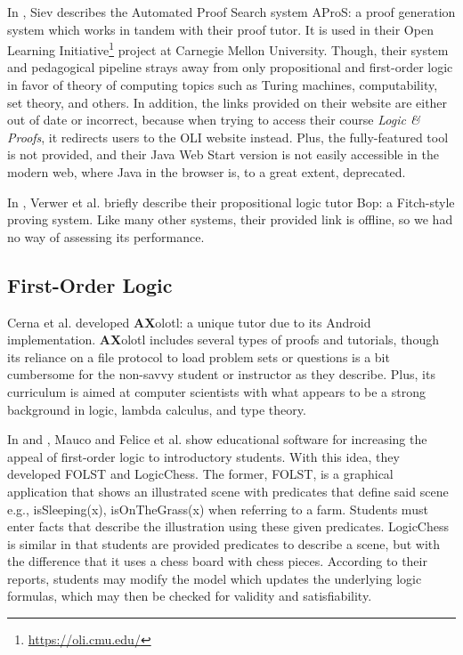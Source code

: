 \documentclass[ms]{uncgdissertationexp2}
\theoremstyle{plain}
\theoremstyle{definition}
\theoremstyle{remark}
\begin{document}
In \cite{apros}, Siev describes the Automated Proof Search system AProS: a proof generation system which works in tandem with their proof tutor. It is used in their Open Learning Initiative\footnote{\url{https://oli.cmu.edu/}} project at Carnegie Mellon University. Though, their system and pedagogical pipeline strays away from only propositional and first-order logic in favor of theory of computing topics such as Turing machines, computability, set theory, and others. In addition, the links provided on their website are either out of date or incorrect, because when trying to access their course \textit{Logic \& Proofs}, it redirects users to the OLI website instead. Plus, the fully-featured tool is not provided, and their Java Web Start version is not easily accessible in the modern web, where Java in the browser is, to a great extent, deprecated.

In \cite{verwer}, Verwer et al. briefly describe their propositional logic tutor Bop: a Fitch-style proving system. Like many other systems, their provided link is offline, so we had no way of assessing its performance.

\subsection{First-Order Logic}
Cerna et al. \cite{cerna} developed \textbf{AX}olotl: a unique tutor due to its Android implementation. \textbf{AX}olotl includes several types of proofs and tutorials, though its reliance on a file protocol to load problem sets or questions is a bit cumbersome for the non-savvy student or instructor as they describe. Plus, its curriculum is aimed at computer scientists with what appears to be a strong background in logic, lambda calculus, and type theory.

In \cite{mauco} and \cite{felice}, Mauco and Felice et al. show educational software for increasing the appeal of first-order logic to introductory students. With this idea, they developed FOLST and LogicChess. The former, FOLST, is a graphical application that shows an illustrated scene with predicates that define said scene e.g., isSleeping(x), isOnTheGrass(x) when referring to a farm. Students must enter facts that describe the illustration using these given predicates. LogicChess is similar in that students are provided predicates to describe a scene, but with the difference that it uses a chess board with chess pieces. According to their reports, students may modify the model which updates the underlying logic formulas, which may then be checked for validity and satisfiability. 
\end{document}
